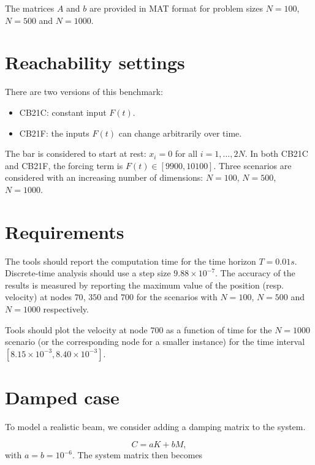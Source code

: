 \documentclass{article}
\begin{document}
The matrices $A$ and $b$ are provided in MAT format for problem sizes $N=100$, $N=500$ and $N=1000$.

\section{Reachability settings}

There are two versions of this benchmark:

\begin{itemize}
    \item CB21C: constant input $F(t)$.
 
     \item CB21F: the inputs $F(t)$ can change arbitrarily over time.
\end{itemize}

The bar is considered to start at rest: $x_i = 0$ for all $i = 1, \ldots, 2N$. In both CB21C and CB21F, the forcing term is $F(t) \in [9900, 10100]$. Three scenarios are considered with an increasing number of dimensions: $N = 100$, $N=500$, $N=1000$.

\section{Requirements}

The tools should report the computation time for the time horizon $T = 0.01s$. Discrete-time analysis should use a step size $9.88\times 10^{-7}$. The accuracy of the results is measured by reporting the maximum value of the position (resp. velocity) at nodes $70$, $350$ and $700$ for the scenarios with $N = 100$, $N=500$ and $N = 1000$ respectively.

Tools should plot the velocity at node $700$ as a function of time for the $N = 1000$ scenario (or the corresponding node for a smaller instance) for the time interval $[8.15\times 10^{-3}, 8.40\times 10^{-3}]$.


\section{Damped case}

To model a realistic beam, we consider adding a damping matrix to the system.

\begin{equation}
	C = aK + bM,
\end{equation}
with $a = b = 10^{-6}$. The system matrix then becomes
\end{document}
